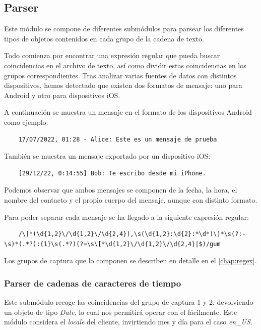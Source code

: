 \subsection{Parser}

Este módulo se compone de diferentes submódulos para parsear los diferentes tipos de objetos contenidos en cada grupo de la cadena de texto.

Todo comienza por encontrar una expresión regular que pueda buscar coincidencias en el archivo de texto, así como dividir estas coincidencias en los grupos correspondientes. Tras analizar varias fuentes de datos con distintos dispositivos, hemos detectado que existen dos formatos de mensaje: uno para Android y otro para dispositivos iOS.

A continuación se muestra un mensaje en el formato de los dispositivos Android como ejemplo:

\begin{lstlisting}
	17/07/2022, 01:28 - Alice: Este es un mensaje de prueba
\end{lstlisting}

También se muestra un mensaje exportado por un dispositivo iOS:

\begin{lstlisting}
	[29/12/22, 0:14:55] Bob: Te escribo desde mi iPhone.
\end{lstlisting}

Podemos observar que ambos mensajes se componen de la fecha, la hora, el nombre del contacto y el propio cuerpo del mensaje, aunque con distinto formato.

Para poder separar cada mensaje se ha llegado a la siguiente expresión regular:

\begin{lstlisting}
	/\[*(\d{1,2}\/\d{1,2}\/\d{2,4}),\s(\d{1,2}:\d{2}:*\d*)\]*\s(?:-\s)*(.*?):{1}\s(.*?)(?=\s\[*\d{1,2}\/\d{1,2}\/\d{2,4}|$)/gum
\end{lstlisting}

Los grupos de captura que lo componen se describen en detalle en el \autoref{chap:regex}.



\subsubsection{Parser de cadenas de caracteres de tiempo}

Este submódulo recoge las coincidencias del grupo de captura 1 y 2, devolviendo un objeto de tipo \textit{Date}, lo cual nos permitirá operar con el fácilmente. Este módulo considera el \textit{locale} del cliente, invirtiendo mes y día para el caso \textit{en\_US}.

